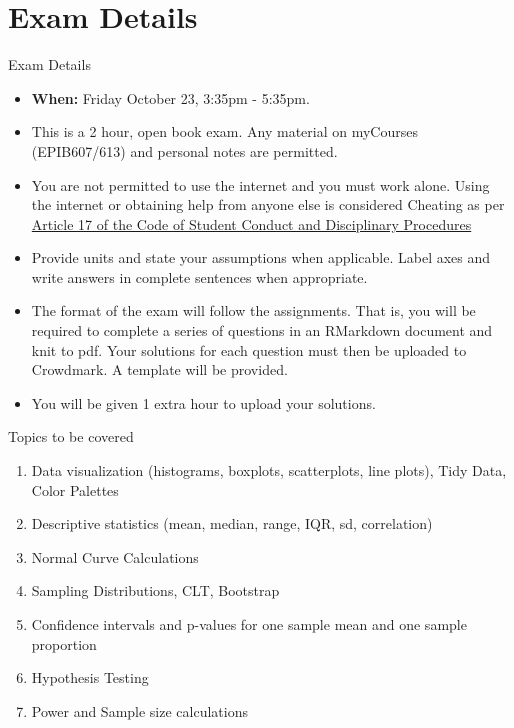 \documentclass[10pt,handout]{beamer}\usepackage[]{graphicx}\usepackage[]{color}
\begin{document}
\section{Exam Details}
\begin{frame}{Exam Details}
	
	\begin{itemize}
		\setlength\itemsep{.51em}
		\item \textbf{When:} Friday October 23, 3:35pm - 5:35pm.
		\item This is a 2 hour, open book exam. Any material on myCourses (EPIB607/613) and personal notes are permitted.
		\item You are not permitted to use the internet and you must work alone. Using the internet or obtaining help from anyone else is considered Cheating as per \href{https://www.mcgill.ca/students/srr/academicrights/integrity/cheating}{Article 17 of the Code of Student Conduct and Disciplinary Procedures}
		\item Provide units and state your assumptions when applicable. Label axes and write answers in complete sentences when appropriate.
		\item The format of the exam will follow the assignments. That is, you will be required to complete a series of questions in an RMarkdown document and knit to pdf. Your solutions for each question must then be uploaded to Crowdmark. A template will be provided.
		\item You will be given 1 extra hour to upload your solutions.
		
	\end{itemize}
	
\end{frame}

\begin{frame}{Topics to be covered}
	
	\begin{enumerate}
		\setlength\itemsep{.51em}
		\item Data visualization (histograms, boxplots, scatterplots, line plots), Tidy Data, Color Palettes
		\item Descriptive statistics (mean, median, range, IQR, sd, correlation)
		\item Normal Curve Calculations
		\item Sampling Distributions, CLT, Bootstrap
		\item Confidence intervals and p-values for one sample mean and one sample proportion
		\item Hypothesis Testing
		\item Power and Sample size calculations
	\end{enumerate}
	
\end{frame}
\end{document}
